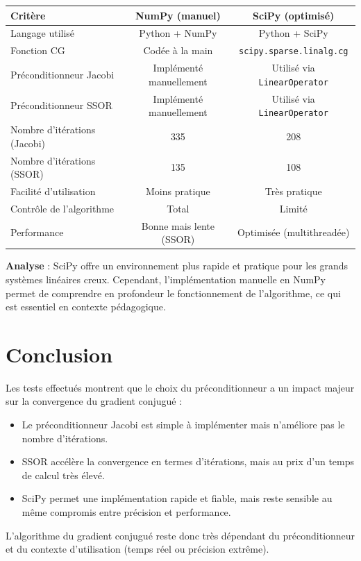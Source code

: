 \documentclass[12pt,a4paper]{article}
\begin{document}
	\begin{center}
		\begin{tabular}{|l|c|c|}
			\hline
			\textbf{Critère} & \textbf{NumPy (manuel)} & \textbf{SciPy (optimisé)} \\
			\hline
			Langage utilisé & Python + NumPy & Python + SciPy \\
			\hline
			Fonction CG & Codée à la main & \texttt{scipy.sparse.linalg.cg} \\
			\hline
			Préconditionneur Jacobi & Implémenté manuellement & Utilisé via \texttt{LinearOperator} \\
			\hline
			Préconditionneur SSOR & Implémenté manuellement & Utilisé via \texttt{LinearOperator} \\
			\hline
			Nombre d'itérations (Jacobi) & 335 & 208 \\
			\hline
			Nombre d'itérations (SSOR) & 135 & 108 \\
			\hline
			Facilité d’utilisation & Moins pratique & Très pratique \\
			\hline
			Contrôle de l’algorithme & Total & Limité \\
			\hline
			Performance & Bonne mais lente (SSOR) & Optimisée (multithreadée) \\
			\hline
		\end{tabular}
	\end{center}
	
	\textbf{Analyse} : SciPy offre un environnement plus rapide et pratique pour les grands systèmes linéaires creux. Cependant, l’implémentation manuelle en NumPy permet de comprendre en profondeur le fonctionnement de l’algorithme, ce qui est essentiel en contexte pédagogique.
	
	\section{Conclusion}
	
	Les tests effectués montrent que le choix du préconditionneur a un impact majeur sur la convergence du gradient conjugué :
	\begin{itemize}
		\item Le préconditionneur Jacobi est simple à implémenter mais n’améliore pas le nombre d’itérations.
		\item SSOR accélère la convergence en termes d’itérations, mais au prix d’un temps de calcul très élevé.
		\item SciPy permet une implémentation rapide et fiable, mais reste sensible au même compromis entre précision et performance.
	\end{itemize}
	
	L’algorithme du gradient conjugué reste donc très dépendant du préconditionneur et du contexte d’utilisation (temps réel ou précision extrême).
\end{document}
